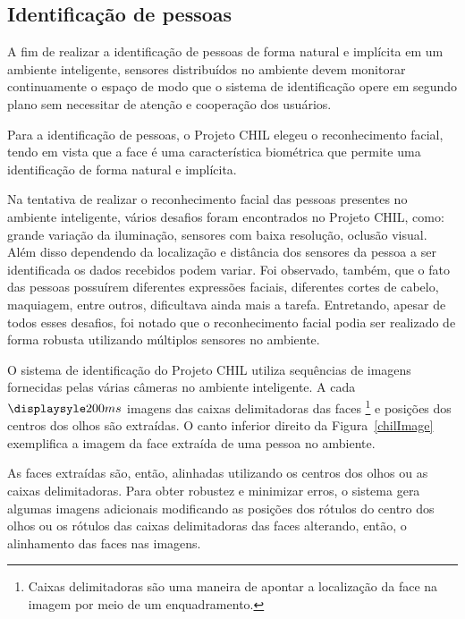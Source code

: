 \subsection{Identificação de pessoas}


A fim de realizar a identificação de pessoas de forma natural e implícita em um ambiente inteligente, sensores distribuídos no ambiente devem monitorar continuamente o espaço de modo que o sistema de identificação opere em segundo plano sem necessitar de atenção e cooperação dos usuários.

Para a identificação de pessoas, o Projeto CHIL elegeu o reconhecimento facial, tendo em vista que a face é uma característica biométrica que permite uma identificação de forma natural e implícita. 


Na tentativa de realizar o reconhecimento facial das pessoas presentes no ambiente inteligente, vários desafios foram encontrados no Projeto CHIL, como: grande variação da iluminação, sensores com baixa resolução, oclusão visual. Além disso dependendo da localização e distância dos sensores da pessoa a ser identificada os dados recebidos podem variar. Foi observado, também, que o fato das pessoas possuírem diferentes expressões faciais, diferentes cortes de cabelo, maquiagem, entre outros, dificultava ainda mais a tarefa. Entretando, apesar de todos esses desafios, foi notado que o reconhecimento facial podia ser realizado de forma robusta utilizando múltiplos sensores no ambiente.

O sistema de identificação do Projeto CHIL utiliza sequências de imagens fornecidas pelas várias câmeras no ambiente inteligente. A cada $\displaysyle 200ms$ imagens das caixas delimitadoras das faces \footnote{Caixas delimitadoras são uma maneira de apontar a localização da face na imagem por meio de um enquadramento.} e posições dos centros dos olhos são extraídas. O canto inferior direito da Figura~\ref{chilImage} exemplifica a imagem da face extraída de uma pessoa no ambiente.

As faces extraídas são, então, alinhadas utilizando os centros dos olhos ou as caixas delimitadoras. Para obter robustez e minimizar erros, o sistema gera algumas imagens adicionais modificando as posições dos rótulos do centro dos olhos ou os rótulos das caixas delimitadoras das faces alterando, então, o alinhamento das faces nas imagens.

